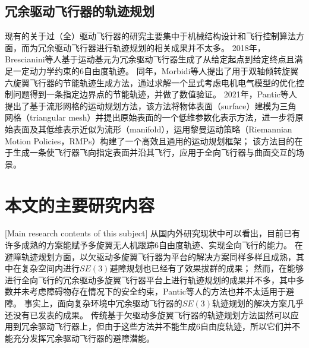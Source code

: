 \subsection{冗余驱动飞行器的轨迹规划}
现有的关于过（全）驱动飞行器的研究主要集中于机械结构设计和飞行控制算法方面，而为冗余驱动飞行器进行轨迹规划的相关成果并不太多。
2018年，Brescianini等人基于运动基元为冗余驱动飞行器生成了从给定起点到给定终点且满足一定动力学约束的6自由度轨迹\cite{brescianini2018computationally}。
同年，Morbidi等人提出了用于双轴倾转旋翼六旋翼飞行器的节能轨迹生成方法\cite{morbidi2018energy}，通过求解一个显式考虑电机电气模型的优化控制问题得到一条指定边界点的节能轨迹，并做了数值验证。
2021年，Pantic等人提出了基于流形网格的运动规划方法\cite{pantic2021mesh}，该方法将物体表面（surface）建模为三角网格（triangular mesh）并提出原始表面的一个低维参数化表示方法，进一步将原始表面及其低维表示近似为流形（manifold），运用黎曼运动策略（Riemannian Motion Policies，RMPs）构建了一个高效且通用的运动规划框架；
该方法目的在于生成一条使飞行器飞向指定表面并沿其飞行，应用于全向飞行器与曲面交互的场景。

\section{本文的主要研究内容}[Main research contents of this subject]
从国内外研究现状中可以看出，目前已有许多成熟的方案能赋予多旋翼无人机跟踪6自由度轨迹、实现全向飞行的能力。
在避障轨迹规划方面，以欠驱动多旋翼飞行器为平台的解决方案同样多样且成熟，其中在复杂空间内进行$SE(3)$避障规划也已经有了效果拔群的成果；
然而，在能够进行全向飞行的冗余驱动多旋翼飞行器平台上进行轨迹规划的成果并不多，其中多数\cite{brescianini2018computationally, morbidi2018energy}并未考虑障碍物存在情况下的安全约束，Pantic等人的方法\cite{pantic2021mesh}也并不太适用于避障。
事实上，面向复杂环境中冗余驱动飞行器的$SE(3)$轨迹规划的解决方案几乎还没有已发表的成果。
传统基于欠驱动多旋翼飞行器的轨迹规划方法固然可以应用到冗余驱动飞行器上，但由于这些方法并不能生成6自由度轨迹，所以它们并不能充分发挥冗余驱动飞行器的避障潜能。

